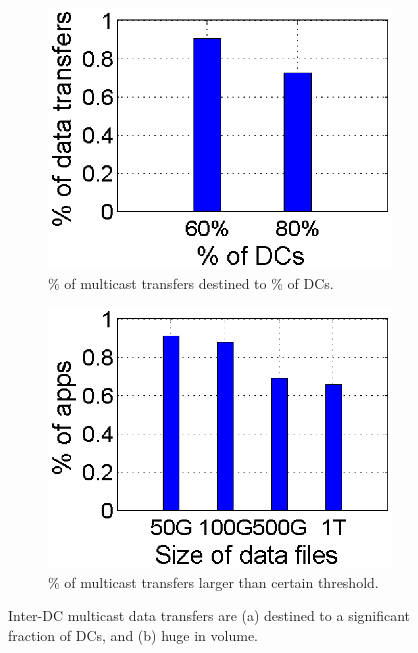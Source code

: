 \begin{figure}[t]
        \centering
        \begin{subfigure}[b]{0.23\textwidth}
                \centering
                \includegraphics[width=\textwidth]{images/destinationDC.eps}%
                \caption{\% of multicast transfers destined to \% of DCs.}
                \label{fig:bulk:dest}
        \end{subfigure}
	\hspace{0.1cm}
        \begin{subfigure}[b]{0.23\textwidth}
                \centering
                \includegraphics[width=\textwidth]{images/DataSize.eps}
                \caption{\% of multicast transfers larger than certain threshold.}
                \label{fig:bulk:size}
        \end{subfigure}
        \caption{Inter-DC multicast data transfers are (a) destined to a significant
fraction of DCs, and (b) huge in volume.}
        \label{fig:bulk}
\vspace{-0.4cm}
\end{figure}

